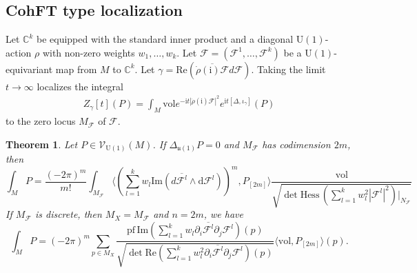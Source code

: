 \documentclass[12pt]{amsart}
\numberwithin{table}{section}
\numberwithin{equation}{section}
\newtheorem{thm}{Theorem}[section]
\theoremstyle{plain}
\newcommand{\C}{\mathbb{C}}
\newcommand{\U}{\mathrm{U}}
\newcommand{\ut}{\mathfrak{u}}
\newcommand{\sF}{\mathcal{F}}
\newcommand{\pf}{\mathrm{pf}\,}
\newcommand{\Hess}{\mathrm{Hess}\,}
\newcommand{\vol}{\mathrm{vol}}
\newcommand{\MV}{\mathcal{V}}
\begin{document}
\subsection{CohFT type localization}

Let $\C^k$ be equipped with the standard inner product and a diagonal $\U(1)$-action $\rho$ with non-zero weights $w_1, \dots, w_k$. Let $\sF=(\sF^1, \dots, \sF^k)$ be a $\U(1)$-equivariant map from $M$ to $\C^k$. Let $\gamma= \mathrm{Re}(\overline{\dot{\rho}(\mathrm{i})\sF} d\sF)$. Taking the limit $t \to \infty$ localizes the integral 
\begin{align}\label{pi}
	Z_{\gamma}[t](P) = \int_M \vol e^{-\mathrm{i}t|\dot{\rho}(\mathrm{i})\sF|^2} e^{\mathrm{i}t[\Delta ,\iota_{\gamma}]}(P)
\end{align}
to the zero locus $M_{\sF}$ of $\sF$.
\begin{thm}\label{pvloccoh}
	Let $P \in \MV_{\U(1)}(M)$. If $\Delta_{\ut(1)} P = 0$ and $M_{\sF}$ has codimension $2m$, then
	\begin{equation}
		\int_M P = \frac{(-2\pi)^m}{m!} \int_{M_{\sF}} \langle (\sum_{l=1}^kw_l\mathrm{Im}(d\overline{\sF^l} \wedge \mathrm{d} \sF^l))^m, P_{[2m]} \rangle \frac{\vol}{\sqrt{\det \Hess(\sum_{l=1}^k w_l^2 |\sF^l|^2)|_{N_{\sF}}}}
	\end{equation}
   If $M_{\sF}$ is discrete, then $M_X  = M_{\sF}$ and $n=2m$, we have
   \begin{equation}
   	\int_M P = (-2\pi)^{m} \sum_{p \in M_{X}} \frac{\pf \mathrm{Im} (\sum_{l=1}^k w_l \partial_i \overline{\sF^l} \partial_j \sF^l)(p)}{\sqrt{\det \mathrm{Re} (\sum_{l=1}^k w_l^2 \partial_i \overline{\sF^l} \partial_j \sF^l)(p)}} \langle \vol, P_{[2m]} \rangle(p).
   \end{equation}
\end{thm}
\end{document}
